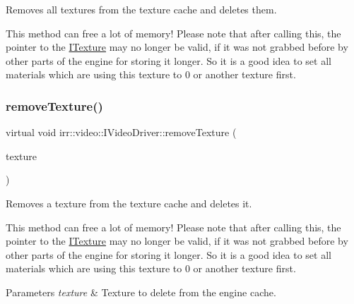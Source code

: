 Removes all textures from the texture cache and deletes them. 

This method can free a lot of memory! Please note that after calling this, the pointer to the \hyperlink{classirr_1_1video_1_1ITexture}{I\+Texture} may no longer be valid, if it was not grabbed before by other parts of the engine for storing it longer. So it is a good idea to set all materials which are using this texture to 0 or another texture first. \mbox{\label{classirr_1_1video_1_1IVideoDriver_ac88319ec41daa23fef2ae935285afcc9}} 
\subsubsection{\texorpdfstring{remove\+Texture()}{removeTexture()}\hspace{0.1cm}{\footnotesize\ttfamily [1/2]}}
{\footnotesize\ttfamily virtual void irr\+::video\+::\+I\+Video\+Driver\+::remove\+Texture (\begin{DoxyParamCaption}\item[{\hyperlink{classirr_1_1video_1_1ITexture}{I\+Texture} $\ast$}]{texture }\end{DoxyParamCaption})\hspace{0.3cm}{\ttfamily [pure virtual]}}



Removes a texture from the texture cache and deletes it. 

This method can free a lot of memory! Please note that after calling this, the pointer to the \hyperlink{classirr_1_1video_1_1ITexture}{I\+Texture} may no longer be valid, if it was not grabbed before by other parts of the engine for storing it longer. So it is a good idea to set all materials which are using this texture to 0 or another texture first. 
\begin{DoxyParams}{Parameters}
{\em texture} & Texture to delete from the engine cache. \\
\hline
\end{DoxyParams}
\mbox{\label{classirr_1_1video_1_1IVideoDriver_ac88319ec41daa23fef2ae935285afcc9}} 
